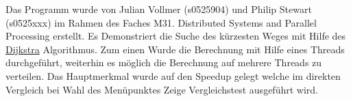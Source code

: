 Das Programm wurde von Julian Vollmer (s0525904) und Philip Stewart (s0525xxx) im Rahmen des Faches M31. Distributed Systems and Parallel Processing erstellt. Es Demonstriert die Suche des kürzesten Weges mit Hilfe des \hyperlink{class_dijkstra}{Dijkstra} Algorithmus. Zum einen Wurde die Berechnung mit Hilfe eines Threads durchgeführt, weiterhin es möglich die Berechnung auf mehrere Threads zu verteilen. Das Hauptmerkmal wurde auf den Speedup gelegt welche im direkten Vergleich bei Wahl des Menüpunktes {\ttfamily Zeige Vergleichstest} ausgeführt wird. 